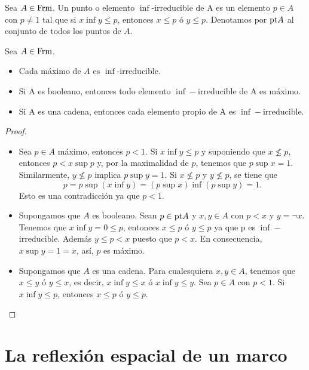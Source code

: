 \begin{defn}
  Sea $A\in \mathrm{Frm}$. Un punto o elemento $\inf$-irreducible de A es un elemento $p\in A$ con $p\neq 1$ tal que si $x\inf y\leq p$, entonces $x\leq p$ ó $y\leq p$. Denotamos por $\mathrm{pt} A$ al conjunto de todos los puntos de $A$.
\end{defn}


\begin{lemma}
  Sea $A\in \mathrm{Frm}$.
  \begin{itemize}
      \item Cada máximo de $A$ es $\inf$-irreducible.
      \item Si A es booleano, entonces todo elemento $\inf-$irreducible de A es máximo.
      \item Si A es una cadena, entonces cada elemento propio de A es $\inf-$irreducible.
  \end{itemize}
\end{lemma}
\begin{proof}\quad
  \begin{itemize}
      \item Sea $p\in A$ máximo, entonces $p<1$. Si $x\inf y\leq p$ y suponiendo que $x\not\leq p$, entonces $p<x\sup p$ y, por la maximalidad de $p$, tenemos que $p\sup x=1$. Similarmente, $y\not\leq p$ implica $p\sup y=1$. Si $x\not\leq p$ y $y\not\leq p$, se tiene que 
      \[p=p\sup (x\inf y)=(p\sup x)\inf(p\sup y)=1.\]
      Esto es una contradicción ya que $p<1$.
      \item Supongamos que $A$ es booleano. Sean $p\in\mathrm{pt} A$ y $x,y\in A$ con $p<x$ y $y=\neg x$. Tenemos que $x\inf y=0\leq p$, entonces $x\leq p$ ó $y\leq p$ ya que p es $\inf-$irreducible. Además $y\leq p<x$ puesto que $p<x$. En consecuencia, $x\sup y=1=x$, así, $p$ es máximo.
      \item Supongamos que $A$ es una cadena. Para cualesquiera $x,y\in A$, tenemos que $x\leq y$ ó $y\leq x$, es decir, $x\inf y\leq x$ ó $x\inf y\leq y$. Sea $p\in A$ con $p<1$. Si $x\inf y\leq p$, entonces $x\leq p$ ó $y\leq p$.
  \end{itemize}
\end{proof}

\section{La reflexión espacial de un marco}


